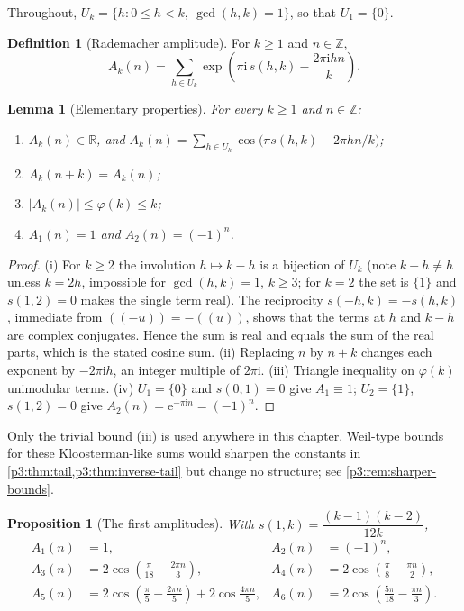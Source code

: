 \documentclass[11pt,a4paper,oneside]{book}
\theoremstyle{plain}
\newtheorem{proposition}[theorem]{Proposition}
\newtheorem{lemma}[theorem]{Lemma}
\theoremstyle{definition}
\newtheorem{definition}[theorem]{Definition}
\theoremstyle{remark}
\newcommand{\Int}{\mathbb{Z}}
\newcommand{\Real}{\mathbb{R}}
\newcommand{\e}{\mathrm{e}}
\newcommand{\ii}{\mathrm{i}}
\begin{document}
Throughout, $U_{k}=\{h:0\le h<k,\ \gcd(h,k)=1\}$, so that $U_{1}=\{0\}$.

\begin{definition}[Rademacher amplitude]\label{p3:def:Ak}
For $k\ge1$ and $n\in\Int$,
\begin{equation}\label{p3:eq:Ak}
 A_{k}(n)=\sum_{h\in U_{k}}
 \exp\!\left(\pi\ii\,s(h,k)-\frac{2\pi\ii hn}{k}\right).
\end{equation}
\end{definition}

\begin{lemma}[Elementary properties]\label{p3:lem:Ak-properties}
For every $k\ge1$ and $n\in\Int$:
\begin{enumerate}
\item $A_{k}(n)\in\Real$, and
$A_{k}(n)=\sum_{h\in U_{k}}\cos\!\bigl(\pi s(h,k)-2\pi hn/k\bigr)$;
\item $A_{k}(n+k)=A_{k}(n)$;
\item $|A_{k}(n)|\le\varphi(k)\le k$;
\item $A_{1}(n)=1$ and $A_{2}(n)=(-1)^{n}$.
\end{enumerate}
\end{lemma}

\begin{proof}
(i) For $k\ge2$ the involution $h\mapsto k-h$ is a bijection of $U_{k}$ (note $k-h\ne h$ unless
$k=2h$, impossible for $\gcd(h,k)=1$, $k\ge3$; for $k=2$ the set is $\{1\}$ and $s(1,2)=0$ makes
the single term real). The reciprocity $s(-h,k)=-s(h,k)$, immediate from $((-u))=-((u))$, shows
that the terms at $h$ and $k-h$ are complex conjugates. Hence the sum is real and equals the sum
of the real parts, which is the stated cosine sum. (ii) Replacing $n$ by $n+k$ changes each
exponent by $-2\pi\ii h$, an integer multiple of $2\pi\ii$. (iii) Triangle inequality on
$\varphi(k)$ unimodular terms. (iv) $U_{1}=\{0\}$ and $s(0,1)=0$ give $A_{1}\equiv1$;
$U_{2}=\{1\}$, $s(1,2)=0$ give $A_{2}(n)=\e^{-\pi\ii n}=(-1)^{n}$.
\end{proof}

Only the trivial bound (iii) is used anywhere in this chapter. Weil-type bounds for these
Kloosterman-like sums would sharpen the constants in \cref{p3:thm:tail,p3:thm:inverse-tail} but
change no structure; see \cref{p3:rem:sharper-bounds}.

\begin{proposition}[The first amplitudes]\label{p3:prop:first-Ak}
With $s(1,k)=\dfrac{(k-1)(k-2)}{12k}$,
\begin{align}
 A_{1}(n)&=1, &
 A_{2}(n)&=(-1)^{n}, \nonumber\\
 A_{3}(n)&=2\cos\!\left(\frac\pi{18}-\frac{2\pi n}{3}\right), &
 A_{4}(n)&=2\cos\!\left(\frac\pi8-\frac{\pi n}{2}\right),
 \label{p3:eq:first-Ak}\\
 A_{5}(n)&=2\cos\!\left(\frac\pi5-\frac{2\pi n}{5}\right)+2\cos\frac{4\pi n}{5},&
 A_{6}(n)&=2\cos\!\left(\frac{5\pi}{18}-\frac{\pi n}{3}\right).\nonumber
\end{align}
\end{proposition}
\end{document}
